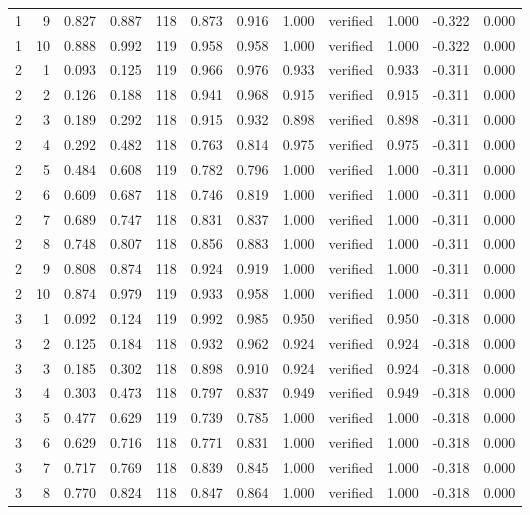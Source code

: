 \begin{tabular}{rrrrrrrrlrrr}
1 & 9 & 0.827 & 0.887 & 118 & 0.873 & 0.916 & 1.000 & verified & 1.000 & -0.322 & 0.000 \\
1 & 10 & 0.888 & 0.992 & 119 & 0.958 & 0.958 & 1.000 & verified & 1.000 & -0.322 & 0.000 \\
2 & 1 & 0.093 & 0.125 & 119 & 0.966 & 0.976 & 0.933 & verified & 0.933 & -0.311 & 0.000 \\
2 & 2 & 0.126 & 0.188 & 118 & 0.941 & 0.968 & 0.915 & verified & 0.915 & -0.311 & 0.000 \\
2 & 3 & 0.189 & 0.292 & 118 & 0.915 & 0.932 & 0.898 & verified & 0.898 & -0.311 & 0.000 \\
2 & 4 & 0.292 & 0.482 & 118 & 0.763 & 0.814 & 0.975 & verified & 0.975 & -0.311 & 0.000 \\
2 & 5 & 0.484 & 0.608 & 119 & 0.782 & 0.796 & 1.000 & verified & 1.000 & -0.311 & 0.000 \\
2 & 6 & 0.609 & 0.687 & 118 & 0.746 & 0.819 & 1.000 & verified & 1.000 & -0.311 & 0.000 \\
2 & 7 & 0.689 & 0.747 & 118 & 0.831 & 0.837 & 1.000 & verified & 1.000 & -0.311 & 0.000 \\
2 & 8 & 0.748 & 0.807 & 118 & 0.856 & 0.883 & 1.000 & verified & 1.000 & -0.311 & 0.000 \\
2 & 9 & 0.808 & 0.874 & 118 & 0.924 & 0.919 & 1.000 & verified & 1.000 & -0.311 & 0.000 \\
2 & 10 & 0.874 & 0.979 & 119 & 0.933 & 0.958 & 1.000 & verified & 1.000 & -0.311 & 0.000 \\
3 & 1 & 0.092 & 0.124 & 119 & 0.992 & 0.985 & 0.950 & verified & 0.950 & -0.318 & 0.000 \\
3 & 2 & 0.125 & 0.184 & 118 & 0.932 & 0.962 & 0.924 & verified & 0.924 & -0.318 & 0.000 \\
3 & 3 & 0.185 & 0.302 & 118 & 0.898 & 0.910 & 0.924 & verified & 0.924 & -0.318 & 0.000 \\
3 & 4 & 0.303 & 0.473 & 118 & 0.797 & 0.837 & 0.949 & verified & 0.949 & -0.318 & 0.000 \\
3 & 5 & 0.477 & 0.629 & 119 & 0.739 & 0.785 & 1.000 & verified & 1.000 & -0.318 & 0.000 \\
3 & 6 & 0.629 & 0.716 & 118 & 0.771 & 0.831 & 1.000 & verified & 1.000 & -0.318 & 0.000 \\
3 & 7 & 0.717 & 0.769 & 118 & 0.839 & 0.845 & 1.000 & verified & 1.000 & -0.318 & 0.000 \\
3 & 8 & 0.770 & 0.824 & 118 & 0.847 & 0.864 & 1.000 & verified & 1.000 & -0.318 & 0.000 \\

\end{tabular}
